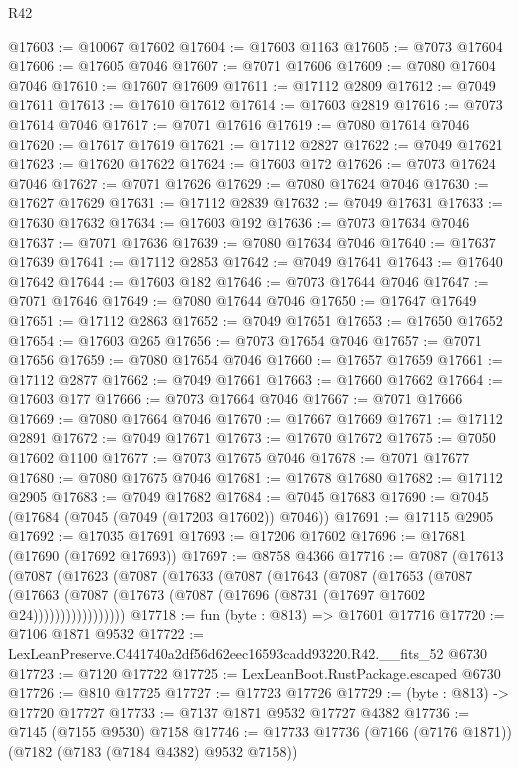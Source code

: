 \begin{lexlean}{R42}
\begin{coremodule}
{@17603 := @10067 @17602
@17604 := @17603 @1163
@17605 := @7073 @17604
@17606 := @17605 @7046
@17607 := @7071 @17606
@17609 := @7080 @17604 @7046
@17610 := @17607 @17609
@17611 := @17112 @2809
@17612 := @7049 @17611
@17613 := @17610 @17612
@17614 := @17603 @2819
@17616 := @7073 @17614 @7046
@17617 := @7071 @17616
@17619 := @7080 @17614 @7046
@17620 := @17617 @17619
@17621 := @17112 @2827
@17622 := @7049 @17621
@17623 := @17620 @17622
@17624 := @17603 @172
@17626 := @7073 @17624 @7046
@17627 := @7071 @17626
@17629 := @7080 @17624 @7046
@17630 := @17627 @17629
@17631 := @17112 @2839
@17632 := @7049 @17631
@17633 := @17630 @17632
@17634 := @17603 @192
@17636 := @7073 @17634 @7046
@17637 := @7071 @17636
@17639 := @7080 @17634 @7046
@17640 := @17637 @17639
@17641 := @17112 @2853
@17642 := @7049 @17641
@17643 := @17640 @17642
@17644 := @17603 @182
@17646 := @7073 @17644 @7046
@17647 := @7071 @17646
@17649 := @7080 @17644 @7046
@17650 := @17647 @17649
@17651 := @17112 @2863
@17652 := @7049 @17651
@17653 := @17650 @17652
@17654 := @17603 @265
@17656 := @7073 @17654 @7046
@17657 := @7071 @17656
@17659 := @7080 @17654 @7046
@17660 := @17657 @17659
@17661 := @17112 @2877
@17662 := @7049 @17661
@17663 := @17660 @17662
@17664 := @17603 @177
@17666 := @7073 @17664 @7046
@17667 := @7071 @17666
@17669 := @7080 @17664 @7046
@17670 := @17667 @17669
@17671 := @17112 @2891
@17672 := @7049 @17671
@17673 := @17670 @17672
@17675 := @7050 @17602 @1100
@17677 := @7073 @17675 @7046
@17678 := @7071 @17677
@17680 := @7080 @17675 @7046
@17681 := @17678 @17680
@17682 := @17112 @2905
@17683 := @7049 @17682
@17684 := @7045 @17683
@17690 := @7045 (@17684 (@7045 (@7049 (@17203 @17602)) @7046))
@17691 := @17115 @2905
@17692 := @17035 @17691
@17693 := @17206 @17602
@17696 := @17681 (@17690 (@17692 @17693))
@17697 := @8758 @4366
@17716 := @7087
    (@17613
      (@7087
        (@17623
          (@7087
            (@17633
              (@7087
                (@17643
                  (@7087
                    (@17653
                      (@7087
                        (@17663
                          (@7087 (@17673 (@7087 (@17696 (@8731 (@17697 @17602 @24)))))))))))))))))
@17718 := fun (byte : @813) => @17601 @17716
@17720 := @7106 @1871 @9532
@17722 := LexLeanPreserve.C441740a2df56d62eec16593cadd93220.R42.__fits_52 @6730
@17723 := @7120 @17722
@17725 := LexLeanBoot.RustPackage.escaped @6730
@17726 := @810 @17725
@17727 := @17723 @17726
@17729 := (byte : @813) -> @17720 @17727
@17733 := @7137 @1871 @9532 @17727 @4382
@17736 := @7145 (@7155 @9530) @7158
@17746 := @17733 @17736 (@7166 (@7176 @1871)) (@7182 (@7183 (@7184 @4382) @9532 @7158))
}
\end{coremodule}
\end{lexlean}
